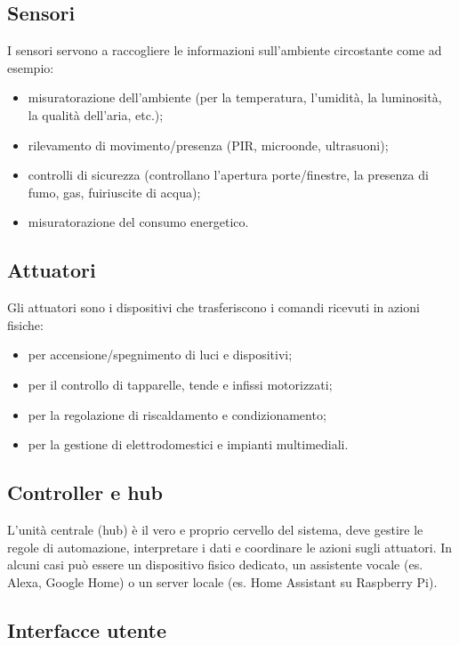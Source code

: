 \subsection{Sensori}

I sensori servono a raccogliere le informazioni sull’ambiente circostante come ad esempio:

\begin{itemize}
    \item misuratorazione dell'ambiente (per la temperatura, l'umidità, la luminosità, la qualità dell’aria, etc.);
    \item rilevamento di movimento/presenza (PIR, microonde, ultrasuoni);
    \item controlli di sicurezza (controllano l'apertura porte/finestre, la presenza di fumo, gas, fuiriuscite di acqua);
    \item misuratorazione del consumo energetico.
\end{itemize}

\subsection{Attuatori}

Gli attuatori sono i dispositivi che trasferiscono i comandi ricevuti in azioni fisiche:

\begin{itemize}
    \item per accensione/spegnimento di luci e dispositivi;
    \item per il controllo di tapparelle, tende e infissi motorizzati;
    \item per la regolazione di riscaldamento e condizionamento;
    \item per la gestione di elettrodomestici e impianti multimediali.
\end{itemize}

\subsection{Controller e hub}

L’unità centrale (hub) è il vero e proprio cervello del sistema, deve gestire le regole di automazione, interpretare i dati e coordinare le azioni sugli attuatori. In alcuni casi può essere un dispositivo fisico dedicato, un assistente vocale (es. Alexa, Google Home) o un server locale (es. Home Assistant su Raspberry Pi).

\subsection{Interfacce utente}


